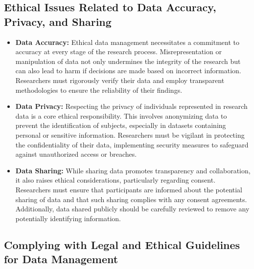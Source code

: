 \documentclass[
]{book}
\begin{document}
\hypertarget{ethical-issues-related-to-data-accuracy-privacy-and-sharing}{%
\subsection*{Ethical Issues Related to Data Accuracy, Privacy, and Sharing}\label{ethical-issues-related-to-data-accuracy-privacy-and-sharing}}

\begin{itemize}
\item
  \textbf{Data Accuracy:} Ethical data management necessitates a commitment to accuracy at every stage of the research process. Misrepresentation or manipulation of data not only undermines the integrity of the research but can also lead to harm if decisions are made based on incorrect information. Researchers must rigorously verify their data and employ transparent methodologies to ensure the reliability of their findings.
\item
  \textbf{Data Privacy:} Respecting the privacy of individuals represented in research data is a core ethical responsibility. This involves anonymizing data to prevent the identification of subjects, especially in datasets containing personal or sensitive information. Researchers must be vigilant in protecting the confidentiality of their data, implementing security measures to safeguard against unauthorized access or breaches.
\item
  \textbf{Data Sharing:} While sharing data promotes transparency and collaboration, it also raises ethical considerations, particularly regarding consent. Researchers must ensure that participants are informed about the potential sharing of data and that such sharing complies with any consent agreements. Additionally, data shared publicly should be carefully reviewed to remove any potentially identifying information.
\end{itemize}

\hypertarget{complying-with-legal-and-ethical-guidelines-for-data-management}{%
\subsection*{Complying with Legal and Ethical Guidelines for Data Management}\label{complying-with-legal-and-ethical-guidelines-for-data-management}}
\end{document}
